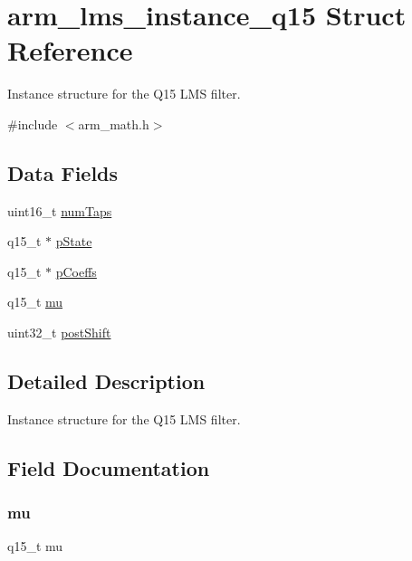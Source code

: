 \hypertarget{structarm__lms__instance__q15}{}\section{arm\+\_\+lms\+\_\+instance\+\_\+q15 Struct Reference}
\label{structarm__lms__instance__q15}


Instance structure for the Q15 L\+MS filter.  




{\ttfamily \#include $<$arm\+\_\+math.\+h$>$}

\subsection*{Data Fields}
\begin{DoxyCompactItemize}
\item 
uint16\+\_\+t \mbox{\hyperlink{structarm__lms__instance__q15_a751941891e47f522a7f5375fe8990aac}{num\+Taps}}
\item 
q15\+\_\+t $\ast$ \mbox{\hyperlink{structarm__lms__instance__q15_ae29dfdb736374fcddaeaec4b7770170c}{p\+State}}
\item 
q15\+\_\+t $\ast$ \mbox{\hyperlink{structarm__lms__instance__q15_a7ca181a37f714d174445f486bebce26f}{p\+Coeffs}}
\item 
q15\+\_\+t \mbox{\hyperlink{structarm__lms__instance__q15_aab4745770bd667de040227eec1b5ff8d}{mu}}
\item 
uint32\+\_\+t \mbox{\hyperlink{structarm__lms__instance__q15_aa2cacddfc5e1d86905d7d31a18b1979b}{post\+Shift}}
\end{DoxyCompactItemize}


\subsection{Detailed Description}
Instance structure for the Q15 L\+MS filter. 

\subsection{Field Documentation}
\mbox{\label{structarm__lms__instance__q15_aab4745770bd667de040227eec1b5ff8d}} 
\subsubsection{\texorpdfstring{mu}{mu}}
{\footnotesize\ttfamily q15\+\_\+t mu}

